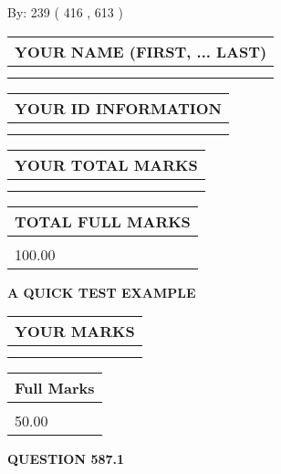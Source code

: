 \documentclass[12pt]{article}
\begin{document}
   
\hspace{1.0in} By: 
 239 ( 416 ,  613 )
   
   
   
   
\newpage 
\setcounter{page}{ 
   587001 } 
   
   
   
   
\noindent\begin{tabular}{|l|}
\hline
YOUR NAME (FIRST, ... LAST)  \\
\hline
 \\ 
 \\ 
\hline
\end{tabular}
\hspace{0.05in} \begin{tabular}{|l|}
\hline
 YOUR   ID   INFORMATION  \\
\hline
 \\ 
 \\ 
\hline
\end{tabular}
   
   
\vspace{0.2in}\noindent\begin{tabular}{|l|}
\hline
YOUR TOTAL MARKS  \\
\hline
 \\ 
 \\ 
\hline
\end{tabular}
\hspace{0.05in} \begin{tabular}{|l|}
\hline
TOTAL FULL MARKS  \\
\hline
 \\ 
100.00 \\
\hline
\end{tabular}
   
   
 \vspace{0.2in}
{\LARGE {\textbf{ A QUICK TEST EXAMPLE}}}
   
   
  
\vspace{0.2in}
  
\noindent\begin{tabular}{|l|}
\hline
 YOUR MARKS  \\
\hline
 \\ 
 \\ 
\hline
\end{tabular}
\hspace{0.05in} \begin{tabular}{|l|}
\hline
 Full Marks  \\
\hline
 \\ 
50.00 \\
\hline
\end{tabular}
{\textbf{\Large{QUESTION
587.1 
}}}
  
\end{document}
